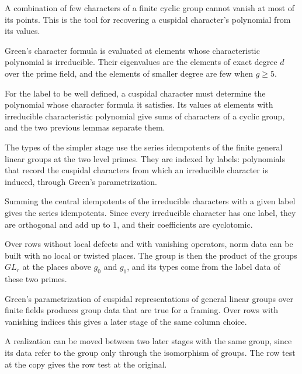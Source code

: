 A combination of few characters of a finite cyclic group cannot vanish at most of its points. This
is the tool for recovering a cuspidal character's polynomial from its values.

Green's character formula is evaluated at elements whose characteristic polynomial is irreducible.
Their eigenvalues are the elements of exact degree $d$ over the prime field, and the elements of
smaller degree are few when $g\ge5$.

For the label to be well defined, a cuspidal character must determine the polynomial whose character
formula it satisfies. Its values at elements with irreducible characteristic polynomial give sums of
characters of a cyclic group, and the two previous lemmas separate them.

The types of the simpler stage use the series idempotents of the finite general linear groups at
the two level primes. They are indexed by labels: polynomials that record the cuspidal characters
from which an irreducible character is induced, through Green's parametrization.

Summing the central idempotents of the irreducible characters with a given label gives the series
idempotents. Since every irreducible character has one label, they are orthogonal and add up to $1$,
and their coefficients are cyclotomic.

Over rows without local defects and with vanishing operators, norm data can be built with no local
or twisted places. The group is then the product of the groups $GL_r$ at the places above $g_0$
and $g_1$, and its types come from the label data of these two primes.

Green's parametrization of cuspidal representations of general linear groups
over finite fields produces group data that are true for a framing. Over rows
with vanishing indices this gives a later stage of the same column choice.

A realization can be moved between two later stages with the same group, since
its data refer to the group only through the isomorphism of groups. The row
test at the copy gives the row test at the original.

